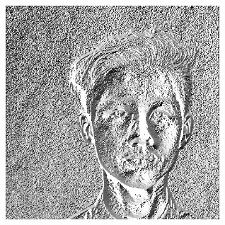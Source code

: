 \documentclass{beamer}
\begin{document}
\begin{frame}
\begin{columns}
\begin{column}{0.5\textwidth}
\begin{center}
                            \includegraphics[width=0.6\textwidth]{pictures/angle.jpg}
                        \end{center}
                    \end{column}
                \end{columns}
            \end{frame}
\end{document}
